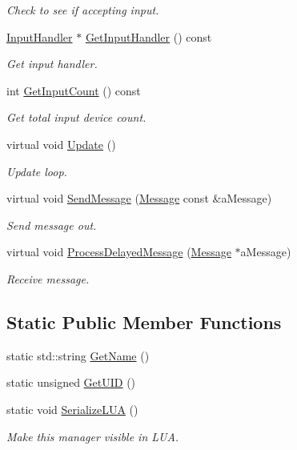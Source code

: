 \begin{DoxyCompactItemize}
\begin{DoxyCompactList}\small\item\em Check to see if accepting input. \end{DoxyCompactList}\item 
\hyperlink{classInputHandler}{Input\+Handler} $\ast$ \hyperlink{classInputManager_ac49964a46da475543ec679df91ca7945}{Get\+Input\+Handler} () const 
\begin{DoxyCompactList}\small\item\em Get input handler. \end{DoxyCompactList}\item 
int \hyperlink{classInputManager_a4abd16e7e3d9dbee7533f7a3f32a8dc2}{Get\+Input\+Count} () const 
\begin{DoxyCompactList}\small\item\em Get total input device count. \end{DoxyCompactList}\item 
virtual void \hyperlink{classInputManager_aa5480931dba2720e7d80dd00a53adae0}{Update} ()
\begin{DoxyCompactList}\small\item\em Update loop. \end{DoxyCompactList}\item 
virtual void \hyperlink{classInputManager_a24bf2c54661a42d3af837b6165f0890b}{Send\+Message} (\hyperlink{classMessage}{Message} const \&a\+Message)
\begin{DoxyCompactList}\small\item\em Send message out. \end{DoxyCompactList}\item 
virtual void \hyperlink{classInputManager_a2bd2dff85a3a9b51eae02d5e3826885e}{Process\+Delayed\+Message} (\hyperlink{classMessage}{Message} $\ast$a\+Message)
\begin{DoxyCompactList}\small\item\em Receive message. \end{DoxyCompactList}\end{DoxyCompactItemize}
\subsection*{Static Public Member Functions}
\begin{DoxyCompactItemize}
\item 
static std\+::string \hyperlink{classInputManager_a98660c994c4c623a2b229fa0528c6c31}{Get\+Name} ()
\item 
static unsigned \hyperlink{classInputManager_ade204f853d96fe85e4bdb8183c2a5b10}{Get\+U\+ID} ()
\item 
static void \hyperlink{classInputManager_ae47978379f8008ccb1e1837d9a3375a3}{Serialize\+L\+UA} ()
\begin{DoxyCompactList}\small\item\em Make this manager visible in L\+UA. \end{DoxyCompactList}\end{DoxyCompactItemize}
